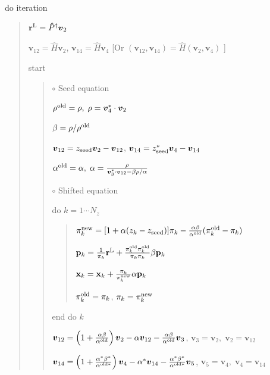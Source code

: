 \documentclass[letterpaper,10pt,dvipdfmx,openany]{sphinxmanual}
\begin{document}
do iteration
\begin{quote}

\({\bf r}^{\rm L} = {\hat P}^\dagger {\boldsymbol v}_2\)

\({\boldsymbol v}_{1 2} = {\hat H} {\boldsymbol v}_2\),
\({\boldsymbol v}_{1 4} = {\hat H} {\boldsymbol v}_4\)
{[}Or \(({\boldsymbol v}_{1 2}, {\boldsymbol v}_{1 4}) = {\hat H} ({\boldsymbol v}_2, {\boldsymbol v}_4)\) {]}

 start
\begin{quote}

\(\circ\) Seed equation

\(\rho^{\rm old} = \rho,\; \rho = {\boldsymbol v}_4^* \cdot {\boldsymbol v}_2\)

\(\beta = \rho / \rho^{\rm old}\)

\({\boldsymbol v}_{1 2} = z_{\rm seed} {\boldsymbol v}_2 - {\boldsymbol v}_{1 2}\),
\({\boldsymbol v}_{1 4} = z_{\rm seed}^* {\boldsymbol v}_4 - {\boldsymbol v}_{1 4}\)

\(\alpha^{\rm old} = \alpha,\; \alpha = \frac{\rho}{{\boldsymbol v}_3^* \cdot {\boldsymbol v}_{1 2} - \beta \rho / \alpha }\)

\(\circ\) Shifted equation

do \(k = 1 \cdots N_z\)
\begin{quote}

\(\pi_k^{\rm new} = [1+\alpha(z_k-z_{\rm seed})]\pi_k - \frac{\alpha \beta}{\alpha^{\rm old}}(\pi_k^{\rm old} - \pi_k)\)

\({\bf p}_{k} = \frac{1}{\pi_k} {\bf r}^{\rm L} + \frac{\pi^{\rm old}_k \pi^{\rm old}_k}{\pi_k \pi_k} \beta {\bf p}_{k}\)

\({\bf x}_{k} = {\bf x}_{k} + \frac{\pi_k}{\pi_k^{\rm new}} \alpha {\bf p}_{k}\)

\(\pi_k^{\rm old} = \pi_k\), \(\pi_k = \pi_k^{\rm new}\)
\end{quote}

end do \(k\)

\({\boldsymbol v}_{1 2} = \left( 1 + \frac{\alpha \beta}{\alpha^{\rm old}} \right) {\boldsymbol v}_2 - \alpha {\boldsymbol v}_{1 2} - \frac{\alpha \beta}{\alpha^{\rm old}} {\boldsymbol v}_3\),
\({\boldsymbol v}_3 = {\boldsymbol v}_2,\; {\boldsymbol v}_2 = {\boldsymbol v}_{1 2}\)

\({\boldsymbol v}_{1 4} = \left( 1 + \frac{\alpha^* \beta^*}{\alpha^{{\rm old}*}} \right) {\boldsymbol v}_4 - \alpha^* {\boldsymbol v}_{1 4} - \frac{\alpha^* \beta^*}{\alpha^{{\rm old} *}} {\boldsymbol v}_5\),
\({\boldsymbol v}_5 = {\boldsymbol v}_4,\; {\boldsymbol v}_4 = {\boldsymbol v}_{1 4}\)


\end{quote}
\end{quote}
\end{document}
